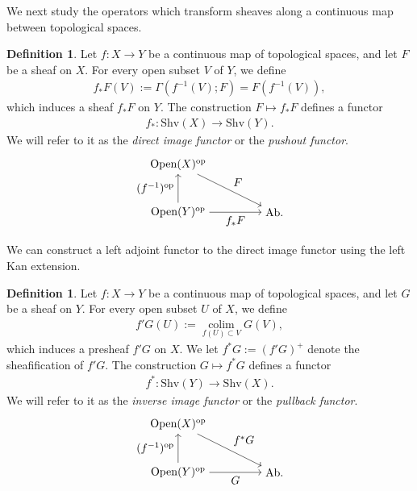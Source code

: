 \documentclass[a4paper,dvipdfmx,11pt,reqno]{amsart}
\DeclareMathOperator{\myop}{op}
\DeclareMathOperator*{\colim}{colim}
\newcommand{\Ab}{\mathrm{Ab}}
\newcommand{\Open}{\mathrm{Open}}
\newcommand{\Shv}{\mathrm{Shv}}
\theoremstyle{definition}
\newtheorem{definition}[theorem]{Definition}
\begin{document}
We next study the operators which transform sheaves along a continuous map between topological spaces.

\begin{definition}
  Let $f : X \to Y$ be a continuous map of topological spaces, and let $F$ be a sheaf on $X$.
  For every open subset $V$ of $Y$, we define 
  \begin{align*}
    f_{\ast}F(V) := \Gamma(f^{-1}(V);F) =  F(f^{-1}(V)),
  \end{align*}
  which induces a sheaf $f_{\ast}F$ on $Y$.
  The construction $F \mapsto f_{\ast}F$ defines a functor 
  \begin{align*}
    f_{\ast} : \Shv(X) \to \Shv(Y).
  \end{align*}
  We will refer to it as the \textit{direct image functor} or the \textit{pushout functor}.
  \[\begin{tikzpicture}[auto,->] 
    \node (tl) at (0,1.5) {$\Open(X)^{\myop}$}; 
    \node (bl) at (0,0) {$\Open(Y)^{\myop}$}; 
    \node (br) at (3,0) {$\Ab.$}; 
    \draw (bl) -- node[swap] {$f_{\ast}F$} (br); 
    \draw (bl) -- node {$(f^{-1})^{\myop}$} (tl);
    \draw (tl) -- node {$F$} (br); 
  \end{tikzpicture}\]
\end{definition}

We can construct a left adjoint functor to the direct image functor using the left Kan extension.

\begin{definition}
  Let $f : X \to Y$ be a continuous map of topological spaces, and let $G$ be a sheaf on $Y$.
  For every open subset $U$ of $X$, we define 
  \begin{align*}
    f'G(U) := \colim\limits_{f(U) \subset V} G(V),
  \end{align*}
  which induces a presheaf $f'G$ on $X$.
  We let $f^{\ast}G := (f'G)^{+}$ denote the sheafification of $f'G$.
  The construction $G \mapsto f^{\ast}G$ defines a functor 
  \begin{align*}
    f^{\ast} : \Shv(Y) \to \Shv(X).
  \end{align*}
  We will refer to it as the \textit{inverse image functor} or the \textit{pullback functor}.
  \[\begin{tikzpicture}[auto,->] 
    \node (tl) at (0,1.5) {$\Open(X)^{\myop}$}; 
    \node (bl) at (0,0) {$\Open(Y)^{\myop}$}; 
    \node (br) at (3,0) {$\Ab.$}; 
    \draw (bl) -- node[swap] {$G$} (br); 
    \draw (bl) -- node {$(f^{-1})^{\myop}$} (tl);
    \draw (tl) -- node {$f^{\ast}G$} (br); 
  \end{tikzpicture}\]
\end{definition}
\end{document}
